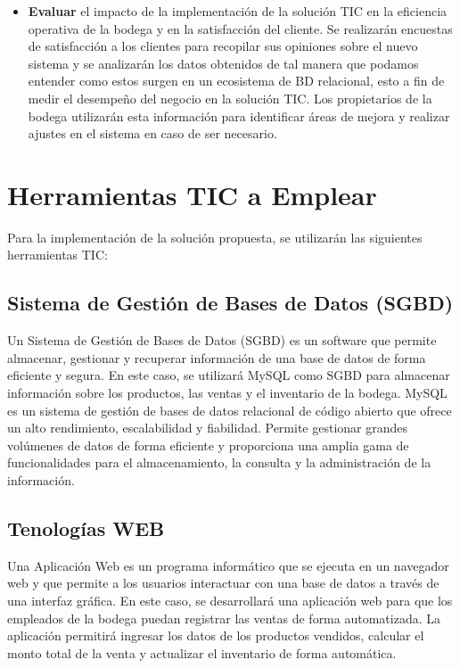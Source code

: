 \documentclass{article}
\begin{document}
\begin{itemize}
      
      \item \textbf{Evaluar} el impacto de la implementación de la solución TIC en la eficiencia operativa de la bodega y en la satisfacción del cliente. Se realizarán encuestas de satisfacción a los clientes para recopilar sus opiniones sobre el nuevo sistema y se analizarán los datos obtenidos de tal manera que podamos entender como estos surgen en un ecosistema de BD relacional, esto a fin de medir el desempeño del negocio en la solución TIC. Los propietarios de la bodega utilizarán esta información para identificar áreas de mejora y realizar ajustes en el sistema en caso de ser necesario.
    \end{itemize}

\newpage

\section{Herramientas TIC a Emplear}

  Para la implementación de la solución propuesta, se utilizarán las siguientes herramientas TIC:

  \subsection{Sistema de Gestión de Bases de Datos (SGBD)}

    Un Sistema de Gestión de Bases de Datos (SGBD) es un software que permite almacenar, gestionar y recuperar información de una base de datos de forma eficiente y segura. En este caso, se utilizará MySQL como SGBD para almacenar información sobre los productos, las ventas y el inventario de la bodega. MySQL es un sistema de gestión de bases de datos relacional de código abierto que ofrece un alto rendimiento, escalabilidad y fiabilidad. Permite gestionar grandes volúmenes de datos de forma eficiente y proporciona una amplia gama de funcionalidades para el almacenamiento, la consulta y la administración de la información.

\vspace{-0.5cm}
  \subsection{Tenologías WEB}

    Una Aplicación Web es un programa informático que se ejecuta en un navegador web y que permite a los usuarios interactuar con una base de datos a través de una interfaz gráfica. En este caso, se desarrollará una aplicación web para que los empleados de la bodega puedan registrar las ventas de forma automatizada. La aplicación permitirá ingresar los datos de los productos vendidos, calcular el monto total de la venta y actualizar el inventario de forma automática.
\end{document}
